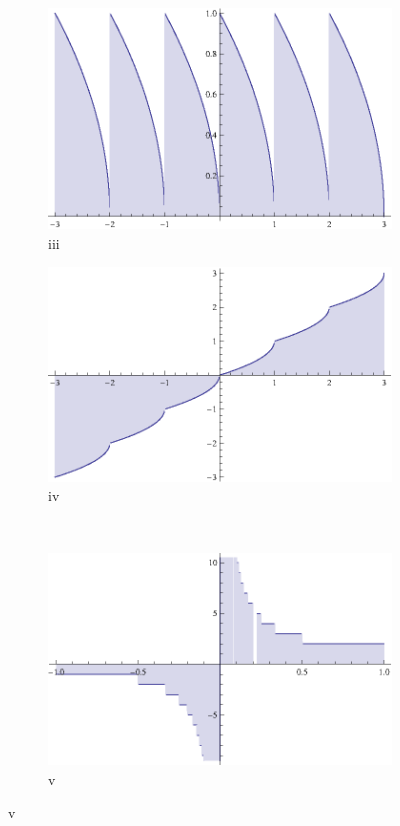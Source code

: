 \documentclass[12pt]{article}
\begin{document}
\begin{figure}[!hblp]
        \begin{subfigure}[b]{0.5\textwidth}
                \includegraphics[width=\textwidth]{3.eps}
                \caption{iii}

        \end{subfigure}%
        \begin{subfigure}[b]{0.5\textwidth}
                \includegraphics[width=\textwidth]{4.eps}
                \caption{iv}

           \end{subfigure}\\
                     \begin{subfigure}[b]{0.5\textwidth}
                \includegraphics[width=\textwidth]{5.eps}
                \caption{v}


\end{subfigure}
\end{figure}
\end{document}
